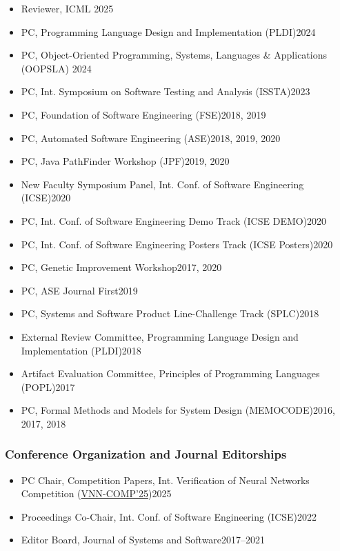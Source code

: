\documentclass[11pt]{article}
\begin{document}
\begin{itemize}
    \item Reviewer, ICML \hfill 2025
    \item PC, Programming Language Design and Implementation (PLDI)\hfill 2024
    \item PC, Object-Oriented Programming, Systems, Languages \& Applications (OOPSLA) \hfill 2024
    \item PC,  Int. Symposium on Software Testing and Analysis (ISSTA)\hfill 2023
    \item PC, Foundation of Software Engineering (FSE)\hfill 2018, 2019
    \item PC, Automated Software Engineering (ASE)\hfill 2018, 2019, 2020
    \item PC, Java PathFinder Workshop (JPF)\hfill 2019, 2020
    \item New Faculty Symposium Panel, Int. Conf. of Software Engineering (ICSE)\hfill 2020
    \item PC, Int. Conf. of Software Engineering Demo Track (ICSE DEMO)\hfill 2020
    \item PC, Int. Conf. of Software Engineering Posters Track (ICSE Posters)\hfill 2020
    \item PC, Genetic Improvement Workshop\hfill 2017, 2020
    \item PC, ASE Journal First\hfill 2019
    \item PC, Systems and Software Product Line-Challenge Track (SPLC)\hfill 2018
    \item External Review Committee, Programming Language Design and Implementation (PLDI)\hfill 2018
    \item Artifact Evaluation Committee, Principles of Programming Languages (POPL)\hfill 2017
    \item PC, Formal Methods and Models for System Design (MEMOCODE)\hfill 2016, 2017, 2018
\end{itemize}

\subsubsection{Conference Organization and Journal Editorships}
\begin{itemize}
    \item PC Chair, Competition Papers, Int. Verification of Neural Networks Competition (\href{https://sites.google.com/view/vnn2025}{VNN-COMP'25})\hfill 2025
    \item Proceedings Co-Chair,  Int. Conf. of Software Engineering (ICSE)\hfill 2022
    \item Editor Board, Journal of Systems and Software\hfill 2017--2021
\end{itemize}
\end{document}
